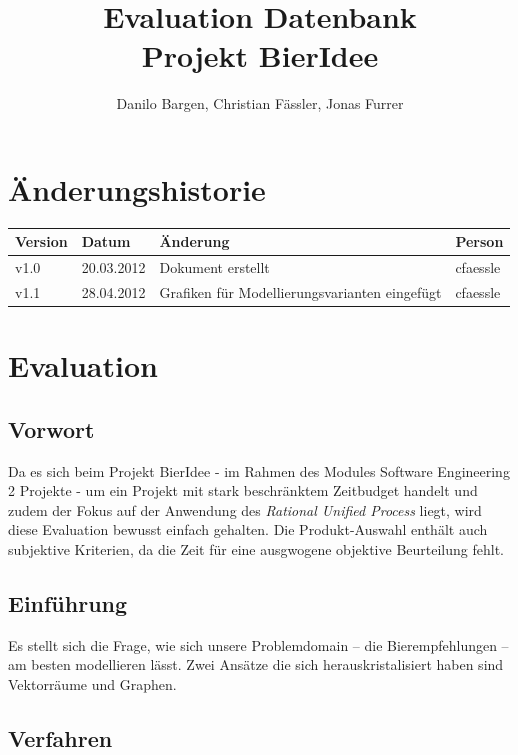 \documentclass[10pt,a4paper]{scrartcl}
\author{Danilo Bargen, Christian Fässler, Jonas Furrer}
\title{Evaluation Datenbank\\Projekt BierIdee}
\begin{document}
\begin{titlepage}
	\maketitle
	\vspace{120mm}
	\thispagestyle{empty} %
\end{titlepage}

\section*{Änderungshistorie}
\begin{tabular}{p{}p{}p{}p{}}
\toprule
\textbf{Version} & \textbf{Datum} & \textbf{Änderung} & \textbf{Person} \\  
\midrule
v1.0 & 20.03.2012 & Dokument erstellt & cfaessle \\  
\hline 
v1.1 & 28.04.2012 & Grafiken für Modellierungsvarianten eingefügt & cfaessle \\
\hline 
\bottomrule
\end{tabular} 
\newpage

\section{Evaluation}

\subsection{Vorwort}

Da es sich beim Projekt BierIdee - im Rahmen des Modules Software Engineering 2 Projekte - um ein
Projekt mit stark beschränktem Zeitbudget handelt und zudem der Fokus auf der Anwendung des
\textit{Rational Unified Process} liegt, wird diese Evaluation bewusst einfach gehalten. Die
Produkt-Auswahl enthält auch subjektive Kriterien, da die Zeit für eine ausgwogene objektive
Beurteilung fehlt.

\subsection{Einführung}

Es stellt sich die Frage, wie sich unsere Problemdomain -- die Bierempfehlungen -- am besten
modellieren lässt. Zwei Ansätze die sich herauskristalisiert haben sind Vektorräume und Graphen.

\subsection{Verfahren}
\end{document}
